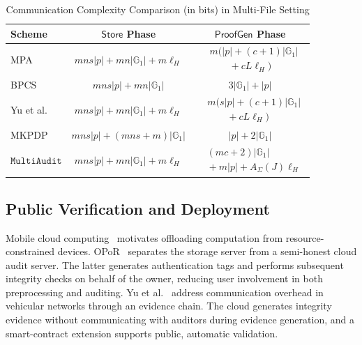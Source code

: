 \documentclass[lettersize,journal]{IEEEtran}
\newcommand{\GG}{\mathbb{G}}
\newcommand{\Store}{\ensuremath{\mathsf{Store}}}
\newcommand{\ProofGen}{\ensuremath{\mathsf{ProofGen}}}
\newcommand{\MultiAudit}{\ensuremath{\mathtt{MultiAudit}}}
\begin{document}
\begin{table}[!h]
\centering
\caption{Communication Complexity Comparison (in bits) in Multi-File Setting}
\label{tab:communication}
\footnotesize
\setlength{\tabcolsep}{2pt}
\renewcommand{\arraystretch}{1.3}
\begin{tabular}{@{}l|c|c@{}}
\hline
\textbf{Scheme} & \textbf{$\Store$ Phase} & \textbf{$\ProofGen$ Phase} \\
\hline
MPA~\cite{XuTIFS26} & $mns|p|+mn|\GG_1|+m\ell_H$ & $\begin{aligned}&m\bigl(|p|+(c+1)|\GG_1|\\&\qquad{}+cL\ell_H\bigr)\end{aligned}$\\\hline
BPCS~\cite{ZhangTPDS23} & $mns|p|+mn|\GG_1|$ & $3|\GG_1|+|p|$\\\hline
Yu et al.~\cite{YuTC25} & $mns|p|+mn|\GG_1|+m\ell_H$ & $\begin{aligned}&m\bigl(s|p|+(c+1)|\GG_1|\\&\qquad{}+cL\ell_H\bigr)\end{aligned}$\\\hline
MKPDP~\cite{MiaoSCIS2026} & $mns|p|+(mns+m)|\GG_1|$ & $|p|+2|\GG_1|$\\
\hline
\textbf{\MultiAudit{}} & $mns|p|+mn|\GG_1|+m\ell_H$ & $\begin{aligned}&(mc+2)|\GG_1|\\&{}+m|p|+A_\Sigma(J)\ell_H\end{aligned}$\\
\hline
\end{tabular}
\end{table}


\subsection{Public Verification and Deployment}
Mobile cloud computing~\cite{Dinh2013MCC} motivates offloading computation from resource-constrained devices. OPoR~\cite{Li2015OPoR} separates the storage server from a semi-honest cloud audit server. The latter generates authentication tags and performs subsequent integrity checks on behalf of the owner, reducing user involvement in both preprocessing and auditing. Yu et al.~\cite{Yu2022Offline} address communication overhead in vehicular networks through an evidence chain. The cloud generates integrity evidence without communicating with auditors during evidence generation, and a smart-contract extension supports public, automatic validation.
\end{document}
